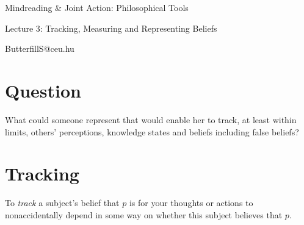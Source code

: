 \documentclass[11pt]{extarticle}
\date{}
\begin{document}
\begin{multicols}{3}

\setlength\footnotesep{1em}









\begin{center}
{\Large
Mindreading \& Joint Action: Philosophical Tools}

Lecture 3: Tracking, Measuring and Representing Beliefs


ButterfillS@ceu.hu
\end{center}

\section{Question}
What could someone represent that would enable her to track, at least within limits, others' perceptions, knowledge states and beliefs including false beliefs? 


\section{Tracking}

%

To \textit{track} a subject's belief that $p$ is for your thoughts or actions to nonaccidentally depend in some way on whether this subject believes that $p$.


\end{multicols}
\end{document}
